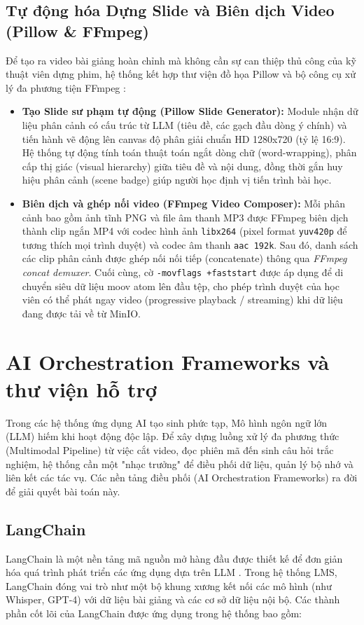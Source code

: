 \subsection{Tự động hóa Dựng Slide và Biên dịch Video (Pillow \& FFmpeg)}
\label{subsec:pillow-ffmpeg-pipeline}
Để tạo ra video bài giảng hoàn chỉnh mà không cần sự can thiệp thủ công của kỹ thuật viên dựng phim, hệ thống kết hợp thư viện đồ họa Pillow và bộ công cụ xử lý đa phương tiện FFmpeg \cite{pillow2024, tomar2006converting}:
\begin{itemize}
    \item \textbf{Tạo Slide sư phạm tự động (Pillow Slide Generator):} Module nhận dữ liệu phân cảnh có cấu trúc từ LLM (tiêu đề, các gạch đầu dòng ý chính) và tiến hành vẽ động lên canvas độ phân giải chuẩn HD 1280x720 (tỷ lệ 16:9). Hệ thống tự động tính toán thuật toán ngắt dòng chữ (word-wrapping), phân cấp thị giác (visual hierarchy) giữa tiêu đề và nội dung, đồng thời gắn huy hiệu phân cảnh (scene badge) giúp người học định vị tiến trình bài học.
    \item \textbf{Biên dịch và ghép nối video (FFmpeg Video Composer):} Mỗi phân cảnh bao gồm ảnh tĩnh PNG và file âm thanh MP3 được FFmpeg biên dịch thành clip ngắn MP4 với codec hình ảnh \texttt{libx264} (pixel format \texttt{yuv420p} để tương thích mọi trình duyệt) và codec âm thanh \texttt{aac 192k}. Sau đó, danh sách các clip phân cảnh được ghép nối nối tiếp (concatenate) thông qua \textit{FFmpeg concat demuxer}. Cuối cùng, cờ \texttt{-movflags +faststart} được áp dụng để di chuyển siêu dữ liệu moov atom lên đầu tệp, cho phép trình duyệt của học viên có thể phát ngay video (progressive playback / streaming) khi dữ liệu đang được tải về từ MinIO.
\end{itemize}

\section{AI Orchestration Frameworks và thư viện hỗ trợ}
Trong các hệ thống ứng dụng AI tạo sinh phức tạp, Mô hình ngôn ngữ lớn (LLM) hiếm khi hoạt động độc lập. Để xây dựng luồng xử lý đa phương thức (Multimodal Pipeline) từ việc cắt video, đọc phiên mã đến sinh câu hỏi trắc nghiệm, hệ thống cần một "nhạc trưởng" để điều phối dữ liệu, quản lý bộ nhớ và liên kết các tác vụ. Các nền tảng điều phối (AI Orchestration Frameworks) ra đời để giải quyết bài toán này.

\subsection{LangChain}
LangChain là một nền tảng mã nguồn mở hàng đầu được thiết kế để đơn giản hóa quá trình phát triển các ứng dụng dựa trên LLM \cite{chase2022langchain}. Trong hệ thống LMS, LangChain đóng vai trò như một bộ khung xương kết nối các mô hình (như Whisper, GPT-4) với dữ liệu bài giảng và các cơ sở dữ liệu nội bộ. Các thành phần cốt lõi của LangChain được ứng dụng trong hệ thống bao gồm:

